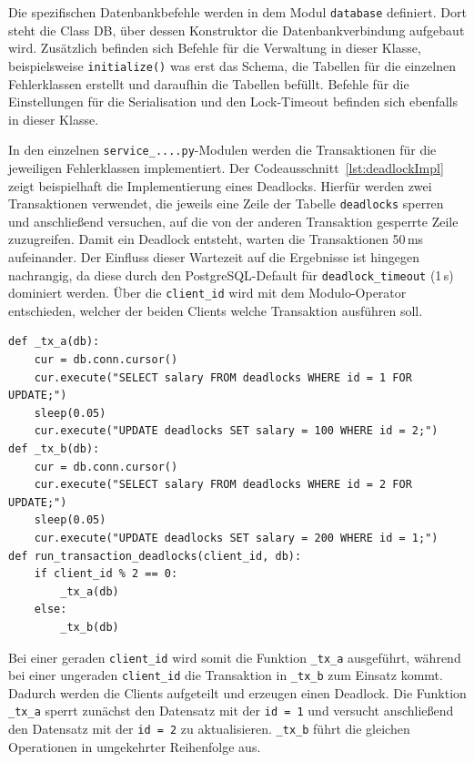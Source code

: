 
Die spezifischen Datenbankbefehle werden in dem Modul \texttt{database} definiert.
Dort steht die Class DB, über dessen Konstruktor die Datenbankverbindung aufgebaut wird.
Zusätzlich befinden sich Befehle für die Verwaltung in dieser Klasse, beispielsweise \texttt{initialize()} was erst
das Schema, die Tabellen für die einzelnen Fehlerklassen erstellt und daraufhin die Tabellen befüllt.
Befehle für die Einstellungen für die Serialisation und den Lock-Timeout befinden sich ebenfalls in dieser Klasse.

In den einzelnen \texttt{service\_....py}-Modulen werden die Transaktionen für die jeweiligen Fehlerklassen
implementiert.
Der Codeausschnitt~\ref{lst:deadlockImpl} zeigt beispielhaft die Implementierung eines Deadlocks.
Hierfür werden zwei Transaktionen verwendet, die jeweils eine Zeile der Tabelle \texttt{deadlocks} sperren und
anschließend versuchen, auf die von der anderen Transaktion gesperrte Zeile zuzugreifen.
Damit ein Deadlock entsteht, warten die Transaktionen 50\,ms aufeinander.
Der Einfluss dieser Wartezeit auf die Ergebnisse ist hingegen nachrangig, da diese durch den PostgreSQL-Default für
\texttt{deadlock\_timeout} (1\,s) dominiert werden.
Über die \texttt{client\_id} wird mit dem Modulo-Operator entschieden, welcher der beiden Clients welche Transaktion
ausführen soll.

\begin{lstlisting}[style=pythoncode, caption={Implementierung eines Deadlocks}, label={lst:deadlockImpl}]
def _tx_a(db):
    cur = db.conn.cursor()
    cur.execute("SELECT salary FROM deadlocks WHERE id = 1 FOR UPDATE;")
    sleep(0.05)
    cur.execute("UPDATE deadlocks SET salary = 100 WHERE id = 2;")
def _tx_b(db):
    cur = db.conn.cursor()
    cur.execute("SELECT salary FROM deadlocks WHERE id = 2 FOR UPDATE;")
    sleep(0.05)
    cur.execute("UPDATE deadlocks SET salary = 200 WHERE id = 1;")
def run_transaction_deadlocks(client_id, db):
    if client_id % 2 == 0:
        _tx_a(db)
    else:
        _tx_b(db)
\end{lstlisting}

Bei einer geraden \texttt{client\_id} wird somit die Funktion \texttt{\_tx\_a} ausgeführt, während bei einer
ungeraden \texttt{client\_id} die Transaktion in \texttt{\_tx\_b} zum Einsatz kommt.
Dadurch werden die Clients aufgeteilt und erzeugen einen Deadlock.
Die Funktion \texttt{\_tx\_a} sperrt zunächst den Datensatz mit der \texttt{id = 1}  und versucht anschließend den
Datensatz mit der \texttt{id = 2} zu aktualisieren.
\texttt{\_tx\_b} führt die gleichen Operationen in umgekehrter Reihenfolge aus.

